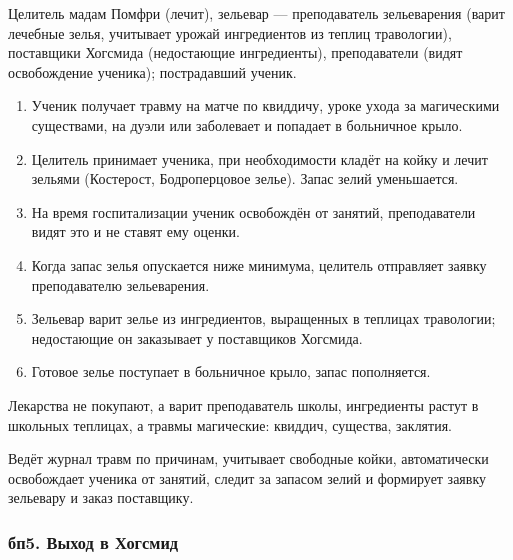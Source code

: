 \documentclass[a4paper,12pt]{article}
\begin{document}
\begin{description}[leftmargin=0pt,labelindent=0pt,style=nextline]
\item[Участники] Целитель мадам Помфри (лечит), зельевар — преподаватель
  зельеварения (варит лечебные зелья, учитывает урожай ингредиентов из теплиц
  травологии), поставщики Хогсмида (недостающие ингредиенты), преподаватели
  (видят освобождение ученика); пострадавший ученик.
\item[Ход процесса]\leavevmode
  \begin{enumerate}
    \item Ученик получает травму на матче по квиддичу, уроке ухода за магическими существами, на дуэли или заболевает и попадает в больничное крыло.
    \item Целитель принимает ученика, при необходимости кладёт на койку и лечит зельями (Костерост, Бодроперцовое зелье). Запас зелий уменьшается.
    \item На время госпитализации ученик освобождён от занятий, преподаватели видят это и не ставят ему оценки.
    \item Когда запас зелья опускается ниже минимума, целитель отправляет заявку преподавателю зельеварения.
    \item Зельевар варит зелье из ингредиентов, выращенных в теплицах травологии; недостающие он заказывает у поставщиков Хогсмида.
    \item Готовое зелье поступает в больничное крыло, запас пополняется.
  \end{enumerate}
\item[Особенность] Лекарства не покупают, а варит преподаватель школы,
  ингредиенты растут в школьных теплицах, а травмы магические: квиддич, существа, заклятия.
\item[Роль ИС] Ведёт журнал травм по причинам, учитывает свободные койки,
  автоматически освобождает ученика от занятий, следит за запасом зелий и формирует
  заявку зельевару и заказ поставщику.
\end{description}
 
\subsubsection*{бп5. Выход в Хогсмид}
 
\end{document}
